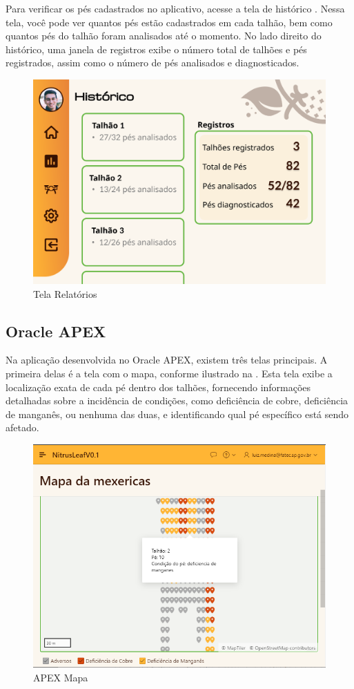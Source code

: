 \documentclass[
    a4paper,%
    12pt,%
    english,%
    brazilian,%
]{article}
\begin{document}
Para verificar os pés cadastrados no aplicativo, acesse a tela de histórico . Nessa tela, você pode ver quantos pés estão cadastrados em cada talhão, bem como quantos pés do talhão foram analisados até o momento. No lado direito do histórico, uma janela de registros exibe o número total de talhões e pés registrados, assim como o número de pés analisados e diagnosticados.

\begin{figure}[H]
\centering
\caption{Tela Relatórios}%
\label{fig:tela-relatorios}
\includegraphics[width=0.8\linewidth]{Logos/tela-relatorios.png}
\end{figure}

\subsection*{\textbf{Oracle APEX}}

Na aplicação desenvolvida no Oracle APEX, existem três telas principais. A primeira delas é a tela com o mapa, conforme ilustrado na . Esta tela exibe a localização exata de cada pé dentro dos talhões, fornecendo informações detalhadas sobre a incidência de condições, como deficiência de cobre, deficiência de manganês, ou nenhuma das duas, e identificando qual pé específico está sendo afetado.

\begin{figure}[H]
\centering
\caption{APEX Mapa}%
\label{fig:APEX-mapa}
\includegraphics[width=0.8\linewidth]{Logos/mapa.png}
\end{figure}
\end{document}
